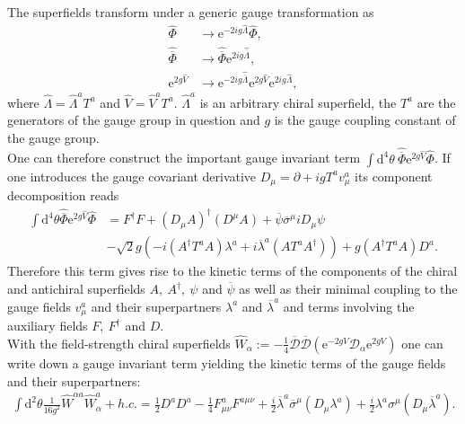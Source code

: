 The superfields transform under a generic gauge transformation as
\begin{align}
\hat{\Phi} &\to \mathrm{e}^{-2ig\hat{\Lambda}}\hat{\Phi},\nonumber\\
\hat{\overline{\Phi}} &\to \hat{\overline{\Phi}}\mathrm{e}^{2ig\hat{\overline{\Lambda}}},\nonumber\\
\mathrm{e}^{2g\hat{V}} &\to \mathrm{e}^{-2ig\hat{\overline{\Lambda}}}\mathrm{e}^{2g\hat{V}} \mathrm{e}^{2ig\hat{\Lambda}},
\end{align}
where $\hat{\Lambda} = \hat{\Lambda}^aT^a$ and $\hat{V} = \hat{V}^aT^a$. $\hat{\Lambda}^a$ is an arbitrary chiral superfield, the $T^a$ are the generators of the gauge group in question and $g$ is the gauge coupling constant of the gauge group.\\
One can therefore construct the important gauge invariant term $\int\mathrm{d}^4\theta\ \hat{\overline{\Phi}}\mathrm{e}^{2g\hat{V}}\hat{\Phi}$. If one introduces the gauge covariant derivative $D_\mu = \partial + ig T^a v^a_\mu$ its component decomposition reads
\begin{align}
\int\mathrm{d}^4\theta\hat{\overline{\Phi}}\mathrm{e}^{2g\hat{V}}\hat{\Phi} &= F^\dagger F + \left(D_\mu A\right)^\dagger \left(D^\mu A\right) + \overline{\psi}\overline{\sigma}^\mu i D_\mu \psi\nonumber \\
&- \sqrt{2}g\left( -i(A^\dagger T^aA)\lambda^a +i\overline{\lambda}^a(AT^aA^\dagger) \right) + g(A^\dagger T^a A) D^a .\label{eq:L_matter}
\end{align}
Therefore this term gives rise to the kinetic terms of the components of the chiral and antichiral superfields $A,\ A^\dagger,\ \psi$ and $\overline{\psi}$ as well as their minimal coupling to the gauge fields $v_\mu^a$ and their superpartners $\lambda^a$ and $\overline{\lambda}^a$ and terms involving the auxiliary fields $F,\ F^\dagger$ and $D$.\\
With the field-strength chiral superfields $\hat{W}_\alpha := -\frac{1}{4}\overline{\mathcal{D}}\overline{\mathcal{D}}(\mathrm{e}^{-2gV}\mathcal{D}_\alpha\mathrm{e}^{2gV})$ one can write down a gauge invariant term yielding the kinetic terms of the gauge fields and their superpartners:
\begin{align}
\int\mathrm{d}^2\theta \frac{1}{16g^2 }\hat{W}^{\alpha a} \hat{W}^a_\alpha + h.c.= \frac{1}{2}D^aD^a -\frac{1}{4}F^a_{\mu\nu}F^{a\mu\nu} + \frac{i}{2}\overline{\lambda}^a\overline{\sigma}^\mu(D_\mu\lambda^a) + \frac{i}{2}\lambda^a\sigma^\mu(D_\mu\overline{\lambda}^a).\label{eq:L_gauge}
\end{align}
